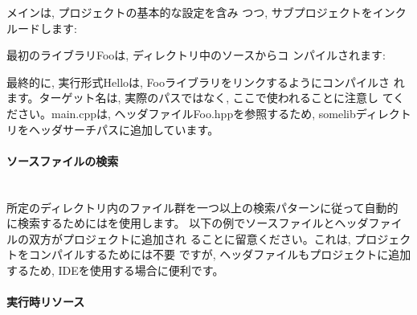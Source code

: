 \documentclass[11pt,a4paper,landscape]{ltjsarticle}
\newcommand{\sectiontitle}[1]{\paragraph{#1} \ \\} %
\begin{document}
\begin{multicols}{2}
\vspace{\baselineskip} %

メインは, プロジェクトの基本的な設定を含み
つつ, サブプロジェクトをインクルードします:


最初のライブラリFooは,  ディレクトリ中のソースからコ
ンパイルされます:




最終的に, 実行形式Helloは, Fooライブラリをリンクするようにコンパイルさ
れます。ターゲット名は, 実際のパスではなく, ここで使われることに注意し
てください。main.cppは, ヘッダファイルFoo.hppを参照するため, somelibディレクト
リをヘッダサーチパスに追加しています。 



\sectiontitle{ソースファイルの検索}


所定のディレクトリ内のファイル群を一つ以上の検索パターンに従って自動的
に検索するためにはを使用します。
以下の例でソースファイルとヘッダファイルの双方がプロジェクトに追加され
ることに留意ください。これは, プロジェクトをコンパイルするためには不要
ですが, ヘッダファイルもプロジェクトに追加するため, IDEを使用する場合に便利です。



\sectiontitle{実行時リソース}


\end{multicols}
\end{document}
